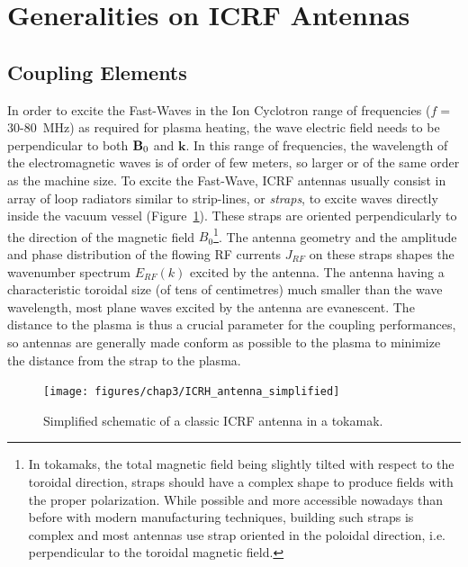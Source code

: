 \section[Generalities]{Generalities on ICRF Antennas}\label{sec:ICRH_antennas_general}

\subsection{Coupling Elements}
In order to excite the Fast-Waves in the Ion Cyclotron range of frequencies ($f=$30-80~MHz) as required for plasma heating, the wave electric field needs to be perpendicular to both ${\mathbf B}_0$ and $\mathbf{k}$. In this range of frequencies, the wavelength of the electromagnetic waves is of order of few meters, so larger or of the same order as the machine size. To excite the Fast-Wave, ICRF antennas usually consist in array of loop radiators similar to strip-lines, or \textit{straps}, to excite waves directly inside the vacuum vessel (Figure~\ref{fig:icrhantennasimplified}). These straps are oriented perpendicularly to the direction of the magnetic field $B_0$\footnote{In tokamaks, the total magnetic field being slightly tilted with respect to the toroidal direction, straps should have a complex shape to produce fields with the proper polarization. While possible and more accessible nowadays than before with modern manufacturing techniques, building such straps is complex and most antennas use strap oriented in the poloidal direction, i.e. perpendicular to the toroidal magnetic field.}. The antenna geometry and the amplitude and phase distribution of the flowing RF currents $J_{RF}$ on these straps shapes the wavenumber spectrum $E_{RF}(k)$ excited by the antenna. The antenna having a characteristic toroidal size (of tens of centimetres) much smaller than the wave wavelength, most plane waves excited by the antenna are evanescent. The distance to the plasma is thus a crucial parameter for the coupling performances, so antennas are generally made conform as possible to the plasma to minimize the distance from the strap to the plasma. 

\begin{figure}
	\centering
	\texttt{[image: figures/chap3/ICRH\_antenna\_simplified]}
	\caption{Simplified schematic of a classic ICRF antenna in a tokamak.}
	\label{fig:icrhantennasimplified}
\end{figure}


